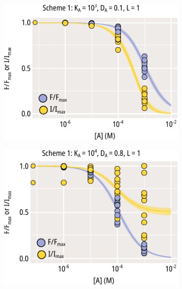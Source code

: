\begin{figure}[hbtp]
	\centering
	\begin{subfigure}[t]{0.3\textwidth}
		\caption{}\label{ch4fig:scheme_1_ka_shift}
		\centering
		\includegraphics[width=\textwidth]{mwc_scheme_1_ka_shift.pdf}
	\end{subfigure}
	\hfill
	\begin{subfigure}[t]{0.3\textwidth}
		\caption{}\label{ch4fig:scheme_1_da_shift}
		\centering
		\includegraphics[width=\textwidth]{mwc_scheme_1_da_shift.pdf}
	\end{subfigure}
	\hfill
	\begin{subfigure}[t]{0.3\textwidth}

\end{subfigure}
\end{figure}
